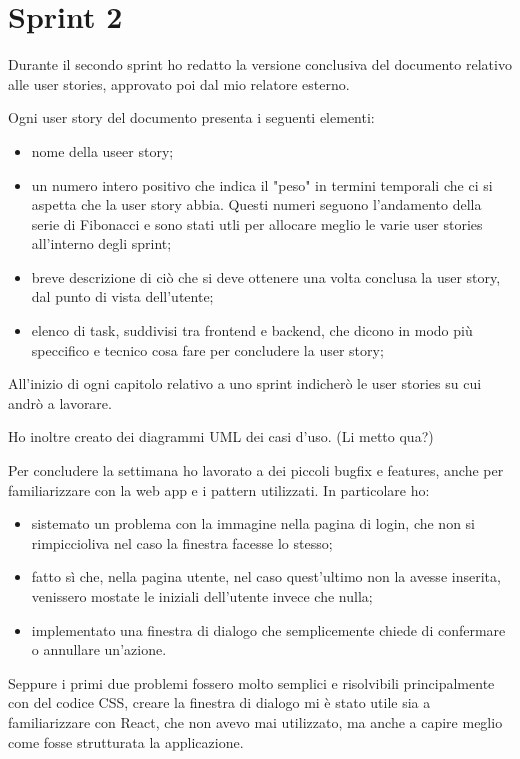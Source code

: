 
\chapter{Sprint 2}
\label{cap:sprint2}

Durante il secondo sprint ho redatto la versione conclusiva del documento relativo alle user stories, approvato poi dal mio relatore esterno.

\noindent Ogni user story del documento presenta i seguenti elementi:
\begin{itemize}
  \item nome della useer story;
  \item un numero intero positivo che indica il "peso" in termini temporali che ci si aspetta che la user story abbia. Questi numeri seguono l'andamento della serie di Fibonacci e sono stati utli per allocare meglio le varie user stories all'interno degli sprint; 
  \item breve descrizione di ciò che si deve ottenere una volta conclusa la user story, dal punto di vista dell'utente;
  \item elenco di task, suddivisi tra frontend e backend, che dicono in modo più speccifico e tecnico cosa fare per concludere la user story;
\end{itemize}

\noindent All'inizio di ogni capitolo relativo a uno sprint indicherò le user stories su cui andrò a lavorare.

Ho inoltre creato dei diagrammi UML dei casi d'uso. (Li metto qua?)

Per concludere la settimana ho lavorato a dei piccoli bugfix e features, anche per familiarizzare con la web app e i pattern utilizzati.
In particolare ho: 
\begin{itemize}
  \item sistemato un problema con la immagine nella pagina di login, che non si rimpiccioliva nel caso la finestra facesse lo stesso;
  \item fatto sì che, nella pagina utente, nel caso quest'ultimo non la avesse inserita, venissero mostate le iniziali dell'utente invece che nulla;
  \item implementato una finestra di dialogo che semplicemente chiede di confermare o annullare un'azione.
\end{itemize}

Seppure i primi due problemi fossero molto semplici e risolvibili principalmente con del codice CSS, creare la finestra di dialogo mi è stato utile sia a familiarizzare con React, che non avevo mai utilizzato, ma anche a capire meglio come fosse strutturata la applicazione.